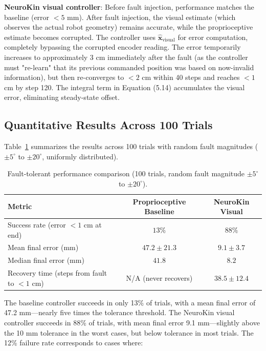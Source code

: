 \documentclass[12pt,a4paper,oneside]{report}
\begin{document}
\textbf{NeuroKin visual controller}: Before fault injection, performance matches the baseline (error $<5$ mm). After fault injection, the visual estimate (which observes the actual robot geometry) remains accurate, while the proprioceptive estimate becomes corrupted. The controller uses $\hat{\mathbf{x}}_{\text{visual}}$ for error computation, completely bypassing the corrupted encoder reading. The error temporarily increases to approximately 3 cm immediately after the fault (as the controller must "re-learn" that its previous commanded position was based on now-invalid information), but then re-converges to $<2$ cm within 40 steps and reaches $<1$ cm by step 120. The integral term in Equation (5.14) accumulates the visual error, eliminating steady-state offset.

\subsection{Quantitative Results Across 100 Trials}

Table~\ref{tab:fault_performance} summarizes the results across 100 trials with random fault magnitudes ($\pm5^\circ$ to $\pm20^\circ$, uniformly distributed).

\begin{table}[H]
\centering
\caption{Fault-tolerant performance comparison (100 trials, random fault magnitude $\pm5^\circ$ to $\pm20^\circ$).}
\label{tab:fault_performance}
\begin{tabular}{lcc}
\toprule
\textbf{Metric} & \textbf{Proprioceptive Baseline} & \textbf{NeuroKin Visual} \\
\midrule
Success rate (error $<1$ cm at end) & $13\%$ & $88\%$ \\
Mean final error (mm) & $47.2 \pm 21.3$ & $9.1 \pm 3.7$ \\
Median final error (mm) & $41.8$ & $8.2$ \\
Recovery time (steps from fault to $<1$ cm) & N/A (never recovers) & $38.5 \pm 12.4$ \\
\bottomrule
\end{tabular}
\end{table}

The baseline controller succeeds in only 13\% of trials, with a mean final error of 47.2 mm—nearly five times the tolerance threshold. The NeuroKin visual controller succeeds in 88\% of trials, with mean final error 9.1 mm—slightly above the 10 mm tolerance in the worst cases, but below tolerance in most trials. The 12\% failure rate corresponds to cases where:
\end{document}
